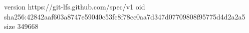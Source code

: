 version https://git-lfs.github.com/spec/v1
oid sha256:42842aaf603a8747e59040c53fc8f78cc0aa7d347d07709808f95775d4d2a2a5
size 349668
